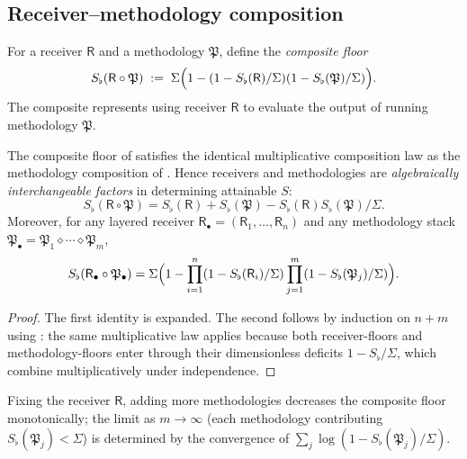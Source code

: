 \documentclass[twocolumn,11pt,a4paper]{article}
\newcommand{\Method}{\mathfrak{P}}
\newcommand{\receiver}{\mathsf{R}}
\newcommand{\Sfloor}{S_{\flat}}
\begin{document}
\subsection{Receiver--methodology composition}

\begin{definition}\label{def:rmcomp}
For a receiver $\receiver$ and a methodology $\Method$, define the
\emph{composite floor}
\[
\Sfloor(\receiver\circ\Method)
\;:=\;
\Sigma\Bigl(1-(1-\Sfloor(\receiver)/\Sigma)(1-\Sfloor(\Method)/\Sigma)\Bigr).
\]
The composite represents using receiver $\receiver$ to evaluate the output
of running methodology $\Method$.
\end{definition}

\begin{theorem}
\label{thm:mode-meth-equiv}
The composite floor of  satisfies the identical
multiplicative composition law as the methodology composition of
. Hence receivers and methodologies are
\emph{algebraically interchangeable factors} in determining attainable
$S$:
\[
\Sfloor(\receiver\circ\Method)
=\Sfloor(\receiver)+\Sfloor(\Method)-\Sfloor(\receiver)\Sfloor(\Method)/\Sigma.
\]
Moreover, for any layered receiver
$\receiver_\bullet=(\receiver_1,\dots,\receiver_n)$ and any methodology
stack $\Method_\bullet=\Method_1\diamond\cdots\diamond\Method_m$,
\[
\Sfloor(\receiver_\bullet\circ\Method_\bullet)
=\Sigma\Bigl(1-\prod_{i=1}^n(1-\Sfloor(\receiver_i)/\Sigma)
\prod_{j=1}^m(1-\Sfloor(\Method_j)/\Sigma)\Bigr).
\]
\end{theorem}

\begin{proof}
The first identity is  expanded. The second follows by
induction on $n+m$ using : the same multiplicative law
applies because both receiver-floors and methodology-floors enter
through their dimensionless deficits $1-\Sfloor/\Sigma$, which combine
multiplicatively under independence.
\end{proof}

\begin{corollary}\label{cor:method-only}
Fixing the receiver $\receiver$, adding more methodologies decreases the
composite floor monotonically; the limit as $m\to\infty$ (each
methodology contributing $\Sfloor(\Method_j)<\Sigma$) is determined by
the convergence of $\sum_j\log(1-\Sfloor(\Method_j)/\Sigma)$.
\end{corollary}
\end{document}
